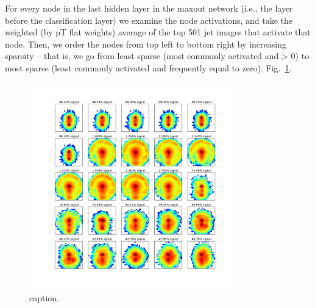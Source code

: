 For every node in the last hidden layer in the maxout network (i.e., the layer before the classification layer) we examine the node activations, and take the weighted (by pT flat  weights) average of the top 501 jet images that activate that node. Then, we order the nodes from top left to bottom right by increasing sparsity -- that is, we go from least sparse (most commonly activated and > 0) to most sparse (least commonly activated and frequently equal to zero). Fig.~\ref{fig:mostactiviate}.

\begin{figure}[!htbp]
  \centering
  \includegraphics[width=0.8\textwidth]{figures/maxnodes.pdf}
  \caption{caption.}
  \label{fig:mostactiviate}
\end{figure}




